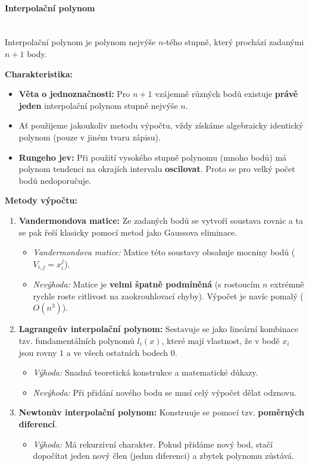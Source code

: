 \paragraph*{Interpolační polynom}~\\ Interpolační polynom je polynom nejvýše \(n\)-tého stupně, který prochází zadanými \(n+1\) body.

\textbf{Charakteristika:}
\begin{itemize}
    \item \textbf{Věta o jednoznačnosti:} Pro $n+1$ vzájemně různých bodů existuje \textbf{právě jeden} interpolační polynom stupně nejvýše $n$.
    \item Ať použijeme jakoukoliv metodu výpočtu, vždy získáme algebraicky identický polynom (pouze v jiném tvaru zápisu).
    \item \textbf{Rungeho jev:} Při použití vysokého stupně polynomu (mnoho bodů) má polynom tendenci na okrajích intervalu \textbf{oscilovat}. Proto se pro velký počet bodů nedoporučuje.
\end{itemize}

\textbf{Metody výpočtu:}
\begin{enumerate}
    \item \textbf{Vandermondova matice:}
    Ze zadaných bodů se vytvoří soustava rovnic a ta se pak řeší klasicky pomocí metod jako Gaussova eliminace.
    \begin{itemize}
        \item \textit{Vandermondova matice:} Matice této soustavy obsahuje mocniny bodů ($V_{i,j} = x_i^j$).
        \item \textit{Nevýhoda:} Matice je \textbf{velmi špatně podmíněná} (s rostoucím $n$ extrémně rychle roste citlivost na zaokrouhlovací chyby). Výpočet je navíc pomalý ($O(n^3)$).
    \end{itemize}
    \item \textbf{Lagrangeův interpolační polynom:} 
    Sestavuje se jako lineární kombinace tzv. fundamentálních polynomů $l_i(x)$, které mají vlastnost, že v bodě $x_i$ jsou rovny $1$ a ve všech ostatních bodech $0$.
    \begin{itemize}
        \item \textit{Výhoda:} Snadná teoretická konstrukce a matematické důkazy.
        \item \textit{Nevýhoda:} Při přidání nového bodu se musí celý výpočet dělat odznovu.
    \end{itemize}
    \item \textbf{Newtonův interpolační polynom:}
    Konstruuje se pomocí tzv. \textbf{poměrných diferencí}. 
    \begin{itemize}
        \item \textit{Výhoda:} Má rekurzivní charakter. Pokud přidáme nový bod, stačí dopočítat jeden nový člen (jednu diferenci) a zbytek polynomu zůstává.
    \end{itemize}
\end{enumerate}

